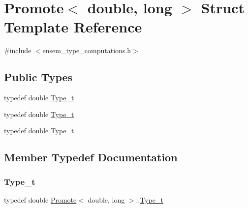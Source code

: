 \hypertarget{structPromote_3_01double_00_01long_01_4}{}\section{Promote$<$ double, long $>$ Struct Template Reference}
\label{structPromote_3_01double_00_01long_01_4}


{\ttfamily \#include $<$ensem\+\_\+type\+\_\+computations.\+h$>$}

\subsection*{Public Types}
\begin{DoxyCompactItemize}
\item 
typedef double \mbox{\hyperlink{structPromote_3_01double_00_01long_01_4_a7c2dadf6e46df10fbef16312d46706ab}{Type\+\_\+t}}
\item 
typedef double \mbox{\hyperlink{structPromote_3_01double_00_01long_01_4_a7c2dadf6e46df10fbef16312d46706ab}{Type\+\_\+t}}
\item 
typedef double \mbox{\hyperlink{structPromote_3_01double_00_01long_01_4_a7c2dadf6e46df10fbef16312d46706ab}{Type\+\_\+t}}
\end{DoxyCompactItemize}


\subsection{Member Typedef Documentation}
\mbox{\label{structPromote_3_01double_00_01long_01_4_a7c2dadf6e46df10fbef16312d46706ab}} 
\subsubsection{\texorpdfstring{Type\_t}{Type\_t}\hspace{0.1cm}{\footnotesize\ttfamily [1/3]}}
{\footnotesize\ttfamily typedef double \mbox{\hyperlink{structPromote}{Promote}}$<$ double, long $>$\+::\mbox{\hyperlink{structPromote_3_01double_00_01long_01_4_a7c2dadf6e46df10fbef16312d46706ab}{Type\+\_\+t}}}

\mbox{\label{structPromote_3_01double_00_01long_01_4_a7c2dadf6e46df10fbef16312d46706ab}} 
